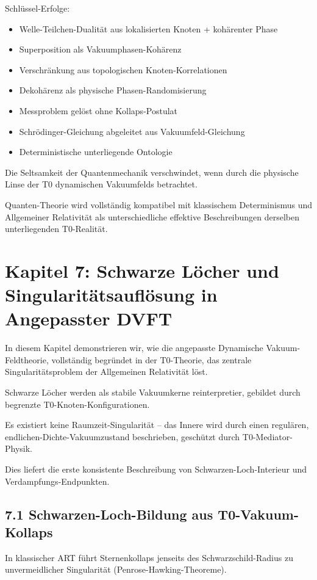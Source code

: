 	Schlüssel-Erfolge:
	\begin{itemize}
		\item Welle-Teilchen-Dualität aus lokalisierten Knoten + kohärenter Phase
		\item Superposition als Vakuumphasen-Kohärenz
		\item Verschränkung aus topologischen Knoten-Korrelationen
		\item Dekohärenz als physische Phasen-Randomisierung
		\item Messproblem gelöst ohne Kollaps-Postulat
		\item Schrödinger-Gleichung abgeleitet aus Vakuumfeld-Gleichung
		\item Deterministische unterliegende Ontologie
	\end{itemize}
	
	Die Seltsamkeit der Quantenmechanik verschwindet, wenn durch die physische Linse der T0 dynamischen Vakuumfelds betrachtet.
	
	Quanten-Theorie wird vollständig kompatibel mit klassischem Determinismus und Allgemeiner Relativität als unterschiedliche effektive Beschreibungen derselben unterliegenden T0-Realität.
	
	\section{Kapitel 7: Schwarze Löcher und Singularitätsauflösung in Angepasster DVFT}
	
	In diesem Kapitel demonstrieren wir, wie die angepasste Dynamische Vakuum-Feldtheorie, vollständig begründet in der T0-Theorie, das zentrale Singularitätsproblem der Allgemeinen Relativität löst.
	
	Schwarze Löcher werden als stabile Vakuumkerne reinterpretier, gebildet durch begrenzte T0-Knoten-Konfigurationen.
	
	Es existiert keine Raumzeit-Singularität – das Innere wird durch einen regulären, endlichen-Dichte-Vakuumzustand beschrieben, geschützt durch T0-Mediator-Physik.
	
	Dies liefert die erste konsistente Beschreibung von Schwarzen-Loch-Interieur und Verdampfungs-Endpunkten.
	
	\subsection{7.1 Schwarzen-Loch-Bildung aus T0-Vakuum-Kollaps}
	
	In klassischer ART führt Sternenkollaps jenseits des Schwarzschild-Radius zu unvermeidlicher Singularität (Penrose-Hawking-Theoreme).
	
